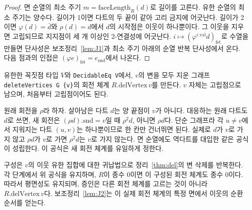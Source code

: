 \begin{proof}
\leanok
면 순열의 최소 주기 \(m=\mathrm{faceLength}_R(d)\)로 길이를 고른다. 유한 순열의 최소 주기는 양수다. 길이가 1이면 다트의 두 끝이 같아 고리 금지에 어긋난다. 길이가 2이면
\(\varphi(d)=\bar d\)와 \(\rho(d)=d\)에서 \(d\)의 시작점은 이웃이 하나뿐이다. 그 이웃을 지우면 고립되므로
지지점이 세 개 이상인 2-연결성에 어긋난다. \(i\mapsto(\varphi^{i.\mathrm{val}}d)_{\mathrm{fst}}\)로 수열을
만들면 단사성은 보조정리~\ref{lem:J1}과 최소 주기 아래의 순열 반복 단사성에서 온다. 다음 점과의 인접은
\((\varphi e)_{\mathrm{fst}}=e_{\mathrm{snd}}\)에서 나온다.
\end{proof}

\begin{definition}
\label{def:delVertex}
\leanok
유한한 꼭짓점 타입 \(V\)와 \texttt{DecidableEq V}에서, \(v\)의 변을 모두 지운 그래프
\texttt{deleteVertices G \{v\}}의 회전 체계 \(R.\mathrm{delVertex}\,v\)를 만든다. \(v\) 자체는
고립점으로 남으며, 처음부터 고립점이어도 된다.

원래 회전을 \(\rho\)라 하자. 살아남은 다트 \(d\)는 양 끝점이 \(v\)가 아니다. 대응하는 원래 다트도
\(d\)로 쓰면, 새 회전은 \((\rho d).\mathrm{snd}=v\)일 때 \(\rho^2d\), 아니면 \(\rho d\)다.
단순 그래프라 각 \(u\ne v\)에서 지워지는 다트 \((u,v)\)는 하나뿐이므로 한 칸만 건너뛰면 된다.
실제로 \(d\)가 \(v\)로 가지 않고 \(\rho d\)가 \(v\)로 가면 \(\rho^2d\)는 \(v\)로 가지 않는다.
면 순열에도 역다트를 대입한 같은 공식이 성립한다. 이 공식은 새 회전 체계를 유일하게 정한다.

구성은 \(v\)의 이웃 유한 집합에 대한 귀납법으로 정리~\ref{thm:del}의 변 삭제를 반복한다.
각 단계에서 위 공식을 유지하며, \(R\)이 종수 0이면 이 구성된 회전 체계도 종수 0이다.
따라서 평면성도 유지되며, 증인은 다른 회전 체계를 고르는 것이 아니라 \(R.\mathrm{delVertex}\,v\)다.
보조정리~\ref{lem:J2}는 이 실제 회전 체계의 특정 면에서 이웃의 순환 순서를 얻는다.
\end{definition}

